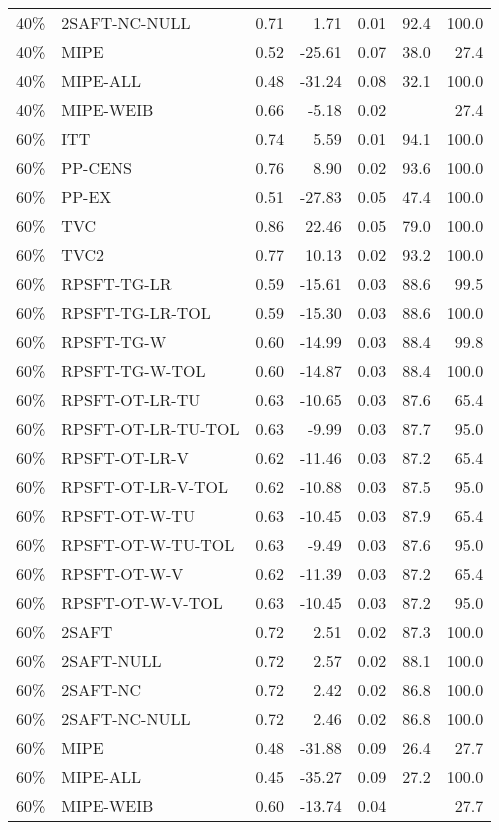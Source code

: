 \begin{table}[ht]
{\begin{tabular}{llrrrrr}
  40\% & 2SAFT-NC-NULL & 0.71 & 1.71 & 0.01 & 92.4 & 100.0 \\ 
  40\% & MIPE & 0.52 & -25.61 & 0.07 & 38.0 & 27.4 \\ 
  40\% & MIPE-ALL & 0.48 & -31.24 & 0.08 & 32.1 & 100.0 \\ 
  40\% & MIPE-WEIB & 0.66 & -5.18 & 0.02 &  & 27.4 \\ 
   \hline
60\% & ITT & 0.74 & 5.59 & 0.01 & 94.1 & 100.0 \\ 
  60\% & PP-CENS & 0.76 & 8.90 & 0.02 & 93.6 & 100.0 \\ 
  60\% & PP-EX & 0.51 & -27.83 & 0.05 & 47.4 & 100.0 \\ 
  60\% & TVC & 0.86 & 22.46 & 0.05 & 79.0 & 100.0 \\ 
  60\% & TVC2 & 0.77 & 10.13 & 0.02 & 93.2 & 100.0 \\ 
   \hline
60\% & RPSFT-TG-LR & 0.59 & -15.61 & 0.03 & 88.6 & 99.5 \\ 
  60\% & RPSFT-TG-LR-TOL & 0.59 & -15.30 & 0.03 & 88.6 & 100.0 \\ 
  60\% & RPSFT-TG-W & 0.60 & -14.99 & 0.03 & 88.4 & 99.8 \\ 
  60\% & RPSFT-TG-W-TOL & 0.60 & -14.87 & 0.03 & 88.4 & 100.0 \\ 
  60\% & RPSFT-OT-LR-TU & 0.63 & -10.65 & 0.03 & 87.6 & 65.4 \\ 
  60\% & RPSFT-OT-LR-TU-TOL & 0.63 & -9.99 & 0.03 & 87.7 & 95.0 \\ 
  60\% & RPSFT-OT-LR-V & 0.62 & -11.46 & 0.03 & 87.2 & 65.4 \\ 
  60\% & RPSFT-OT-LR-V-TOL & 0.62 & -10.88 & 0.03 & 87.5 & 95.0 \\ 
   \hline
60\% & RPSFT-OT-W-TU & 0.63 & -10.45 & 0.03 & 87.9 & 65.4 \\ 
  60\% & RPSFT-OT-W-TU-TOL & 0.63 & -9.49 & 0.03 & 87.6 & 95.0 \\ 
  60\% & RPSFT-OT-W-V & 0.62 & -11.39 & 0.03 & 87.2 & 65.4 \\ 
  60\% & RPSFT-OT-W-V-TOL & 0.63 & -10.45 & 0.03 & 87.2 & 95.0 \\ 
   \hline
60\% & 2SAFT & 0.72 & 2.51 & 0.02 & 87.3 & 100.0 \\ 
  60\% & 2SAFT-NULL & 0.72 & 2.57 & 0.02 & 88.1 & 100.0 \\ 
  60\% & 2SAFT-NC & 0.72 & 2.42 & 0.02 & 86.8 & 100.0 \\ 
  60\% & 2SAFT-NC-NULL & 0.72 & 2.46 & 0.02 & 86.8 & 100.0 \\ 
  60\% & MIPE & 0.48 & -31.88 & 0.09 & 26.4 & 27.7 \\ 
  60\% & MIPE-ALL & 0.45 & -35.27 & 0.09 & 27.2 & 100.0 \\ 
  60\% & MIPE-WEIB & 0.60 & -13.74 & 0.04 &  & 27.7 \\ 
   \hline
\end{tabular}
}
\end{table}
